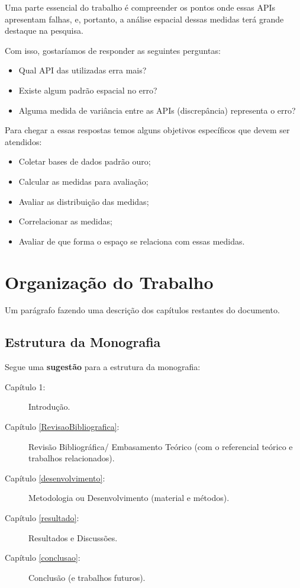 Uma parte essencial do trabalho é compreender os pontos onde essas APIs apresentam falhas, e, portanto, a análise espacial dessas medidas terá grande destaque na pesquisa.

Com isso, gostaríamos de responder as seguintes perguntas:
\begin{itemize}
   \item Qual API das utilizadas erra mais?
   \item Existe algum padrão espacial no erro?
   \item Alguma medida de variância entre as APIs (discrepância) representa o erro? 
\end{itemize}

Para chegar a essas  respostas temos alguns objetivos específicos que devem ser atendidos:
\begin{itemize}
   \item Coletar bases de dados padrão ouro;
   \item Calcular as medidas para avaliação;
   \item Avaliar as distribuição das medidas; 
   \item Correlacionar as medidas; 
   \item Avaliar de que forma o espaço se relaciona com essas medidas.
\end{itemize}





\section{Organização do Trabalho}

Um parágrafo fazendo uma descrição dos capítulos restantes do documento. 

\subsection{Estrutura da Monografia}

Segue uma \textbf{sugestão} para a estrutura da monografia: 

\begin{description}
   \item[Capítulo 1:] Introdução.
   \item[Capítulo \ref{RevisaoBibliografica}:] Revisão Bibliográfica/ Embasamento Teórico (com o referencial teórico e trabalhos relacionados).
   \item[Capítulo \ref{desenvolvimento}:] Metodologia ou Desenvolvimento (material e métodos).
   \item[Capítulo \ref{resultado}:] Resultados e Discussões.
   \item[Capítulo \ref{conclusao}:] Conclusão (e trabalhos futuros).
\end{description}


 









